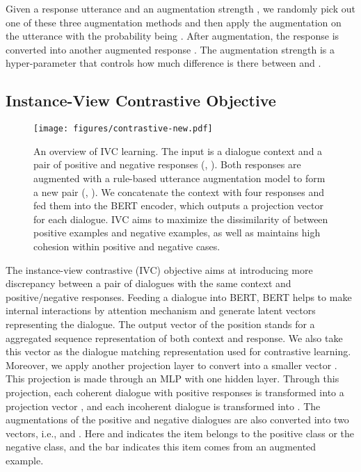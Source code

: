 \documentclass[letterpaper]{article} \usepackage{aaai22}  \usepackage{times}  \usepackage{helvet}  \usepackage{courier}  \usepackage[hyphens]{url}  \usepackage{graphicx} \urlstyle{rm} \def\UrlFont{\rm}  \usepackage{natbib}  \usepackage{caption} \DeclareCaptionStyle{ruled}{labelfont=normalfont,labelsep=colon,strut=off} \frenchspacing  \setlength{\pdfpagewidth}{8.5in}  \setlength{\pdfpageheight}{11in}  \usepackage{algorithm}
\begin{document}
Given a response utterance  and an augmentation strength , we randomly pick out one of these three augmentation methods and then apply the augmentation on the utterance with the probability being . After augmentation, the response  is converted into another augmented response . The augmentation strength  is a hyper-parameter that controls how much difference is there between  and . 


\subsection{Instance-View Contrastive Objective}
\label{sec:ins_cl}

\begin{figure}[htbp]
    \centering
    \texttt{[image: figures/contrastive-new.pdf]}
    \caption{An overview of IVC learning. The input is a dialogue context  and a pair of positive and negative responses (, ). Both responses are augmented with a rule-based utterance augmentation model to form a new pair (, ). We concatenate the context  with four responses and fed them into the BERT encoder, which outputs a projection vector  for each dialogue. IVC aims to maximize the dissimilarity of  between positive examples and negative examples, as well as maintains high cohesion within positive and negative cases.}
    \label{fig:fine_contras}
\end{figure}




The instance-view contrastive (IVC) objective aims at introducing more discrepancy between a pair of dialogues with the same context and positive/negative responses.
Feeding a dialogue into BERT, BERT helps to make internal interactions by attention mechanism and generate latent vectors representing the dialogue. The output vector of the  position  stands for a aggregated sequence representation of both context and response. We also take this vector as the dialogue matching representation used for contrastive learning. Moreover, we apply another projection layer to convert  into a smaller vector . This projection is made through an MLP with one hidden layer.
Through this projection, each coherent dialogue with positive responses  is transformed into a projection vector , and each incoherent dialogue  is transformed into . The augmentations of the positive and negative dialogues are also converted into two vectors, i.e.,   and . Here  and  indicates the item belongs to the positive class or the negative class, and the bar indicates this item comes from an augmented example. 
\end{document}

